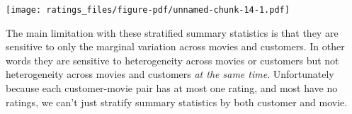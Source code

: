 \documentclass[
  letterpaper,
  DIV=11,
  numbers=noendperiod]{scrartcl}
\newenvironment{Shaded}{\begin{snugshade}}{\end{snugshade}}
\newcommand{\AttributeTok}[1]{\textcolor[rgb]{0.40,0.45,0.13}{#1}}
\newcommand{\ControlFlowTok}[1]{\textcolor[rgb]{0.00,0.23,0.31}{#1}}
\newcommand{\DecValTok}[1]{\textcolor[rgb]{0.68,0.00,0.00}{#1}}
\newcommand{\FloatTok}[1]{\textcolor[rgb]{0.68,0.00,0.00}{#1}}
\newcommand{\FunctionTok}[1]{\textcolor[rgb]{0.28,0.35,0.67}{#1}}
\newcommand{\NormalTok}[1]{\textcolor[rgb]{0.00,0.23,0.31}{#1}}
\newcommand{\OtherTok}[1]{\textcolor[rgb]{0.00,0.23,0.31}{#1}}
\newcommand{\SpecialCharTok}[1]{\textcolor[rgb]{0.37,0.37,0.37}{#1}}
\newcommand{\StringTok}[1]{\textcolor[rgb]{0.13,0.47,0.30}{#1}}
\begin{document}
\begin{Shaded}
\end{Shaded}

\texttt{[image: ratings\_files/figure-pdf/unnamed-chunk-14-1.pdf]}

The main limitation with these stratified summary statistics is that
they are sensitive to only the marginal variation across movies and
customers. In other words they are sensitive to heterogeneity across
movies or customers but not heterogeneity across movies and customers
\emph{at the same time}. Unfortunately because each customer-movie pair
has at most one rating, and most have no ratings, we can't just stratify
summary statistics by both customer and movie.
\end{document}
